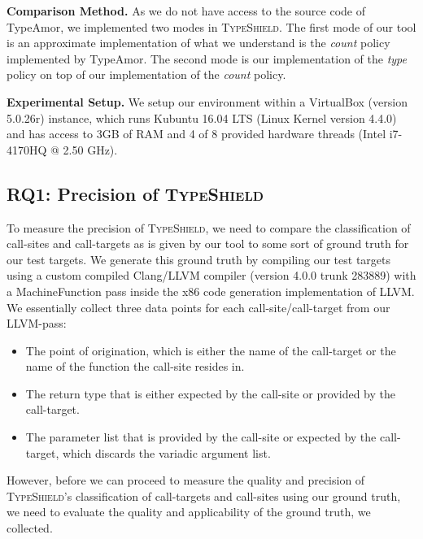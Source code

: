 \textbf{Comparison Method.} As we do not have access to the source code of TypeAmor, we implemented two modes in \textsc{TypeShield}. 
The first mode of our tool is an approximate implementation of what we understand is the \textit{count} 
policy implemented by TypeAmor. The second mode is our implementation of the \textit{type} policy on
top of our implementation of the \textit{count} policy. 

\textbf{Experimental Setup.} We setup our environment within a VirtualBox (version 5.0.26r) instance, which runs Kubuntu 16.04 LTS (Linux Kernel
version 4.4.0) and has access to 3GB of RAM and 4 of 8 provided hardware threads (Intel i7-4170HQ @ 2.50 GHz).

\subsection{RQ1: Precision of \textsc{TypeShield}}
\label{section:typeshieldprecision}

To measure the precision of \textsc{TypeShield}, we need to compare the classification of call-sites and call-targets as is given by our tool to
some sort of ground truth for our test targets. We generate this ground truth by compiling our test targets using a custom compiled Clang/LLVM
compiler (version 4.0.0 trunk 283889) with a MachineFunction pass inside the x86 code generation implementation of LLVM. We essentially 
collect three data points for each call-site/call-target from our LLVM-pass:
\begin{itemize}
\item The point of origination, which is either the name of the call-target or the name of the function the call-site resides in.
\item The return type that is either expected by the call-site or provided by the call-target.
\item The parameter list that is provided by the call-site or expected by the call-target, which discards the variadic argument list.
\end{itemize}
However, before we can proceed to measure the quality and precision of \textsc{TypeShield}'s classification of call-targets and call-sites
using our ground truth, we need to evaluate the quality and applicability of the ground truth, we collected.


